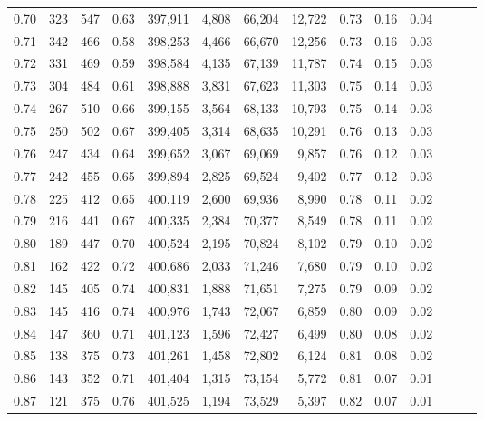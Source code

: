 \begin{tabular}{rrrrrrrrrrrrrr}
0.70 &     323 &    547 &  0.63 &  397,911 &    4,808 &  66,204 &  12,722 &  0.73 &  0.16 &      0.04 \\
0.71 &     342 &    466 &  0.58 &  398,253 &    4,466 &  66,670 &  12,256 &  0.73 &  0.16 &      0.03 \\
0.72 &     331 &    469 &  0.59 &  398,584 &    4,135 &  67,139 &  11,787 &  0.74 &  0.15 &      0.03 \\
0.73 &     304 &    484 &  0.61 &  398,888 &    3,831 &  67,623 &  11,303 &  0.75 &  0.14 &      0.03 \\
0.74 &     267 &    510 &  0.66 &  399,155 &    3,564 &  68,133 &  10,793 &  0.75 &  0.14 &      0.03 \\
0.75 &     250 &    502 &  0.67 &  399,405 &    3,314 &  68,635 &  10,291 &  0.76 &  0.13 &      0.03 \\
0.76 &     247 &    434 &  0.64 &  399,652 &    3,067 &  69,069 &   9,857 &  0.76 &  0.12 &      0.03 \\
0.77 &     242 &    455 &  0.65 &  399,894 &    2,825 &  69,524 &   9,402 &  0.77 &  0.12 &      0.03 \\
0.78 &     225 &    412 &  0.65 &  400,119 &    2,600 &  69,936 &   8,990 &  0.78 &  0.11 &      0.02 \\
0.79 &     216 &    441 &  0.67 &  400,335 &    2,384 &  70,377 &   8,549 &  0.78 &  0.11 &      0.02 \\
0.80 &     189 &    447 &  0.70 &  400,524 &    2,195 &  70,824 &   8,102 &  0.79 &  0.10 &      0.02 \\
0.81 &     162 &    422 &  0.72 &  400,686 &    2,033 &  71,246 &   7,680 &  0.79 &  0.10 &      0.02 \\
0.82 &     145 &    405 &  0.74 &  400,831 &    1,888 &  71,651 &   7,275 &  0.79 &  0.09 &      0.02 \\
0.83 &     145 &    416 &  0.74 &  400,976 &    1,743 &  72,067 &   6,859 &  0.80 &  0.09 &      0.02 \\
0.84 &     147 &    360 &  0.71 &  401,123 &    1,596 &  72,427 &   6,499 &  0.80 &  0.08 &      0.02 \\
0.85 &     138 &    375 &  0.73 &  401,261 &    1,458 &  72,802 &   6,124 &  0.81 &  0.08 &      0.02 \\
0.86 &     143 &    352 &  0.71 &  401,404 &    1,315 &  73,154 &   5,772 &  0.81 &  0.07 &      0.01 \\
0.87 &     121 &    375 &  0.76 &  401,525 &    1,194 &  73,529 &   5,397 &  0.82 &  0.07 &      0.01 \\

\end{tabular}
